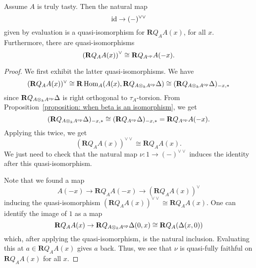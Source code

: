 \documentclass[dissertation.tex]{subfiles}
\begin{document}
\begin{lemma} \label{lemma: duality really is a duality}
  Assume \(A\) is truly tasty. Then the natural map 
  \begin{displaymath}
    \operatorname{id} \to (-)^{\vee \vee}
  \end{displaymath}
  given by evaluation is a quasi-isomorphism for \(\mathbf{R}Q_A A(x)\), for all \(x\). Furthermore, there are quasi-isomorphisms
  \begin{displaymath}
    \left( \mathbf{R}Q_A A(x) \right)^\vee \cong \mathbf{R}Q_{A^{\operatorname{op}}} A(-x).
  \end{displaymath}
\end{lemma}

\begin{proof}
  We first exhibit the latter quasi-isomorphisms. We have 
  \begin{displaymath}
    (\mathbf{R}Q_A A(x))^\vee \cong \mathbf{R}\operatorname{Hom}_A (A(x), \mathbf{R}Q_{A \otimes_k A^{\operatorname{op}}} \Delta) \cong (\mathbf{R}Q_{A \otimes_k A^{\operatorname{op}}} \Delta)_{-x,\ast}
  \end{displaymath}
  since \(\mathbf{R}Q_{A \otimes_k A^{\operatorname{op}}} \Delta\) is right orthogonal to \(\tau_A\)-torsion. From Proposition~\ref{proposition: when beta is an isomorphism}, we get 
  \begin{displaymath}
    (\mathbf{R}Q_{A \otimes_k A^{\operatorname{op}}} \Delta)_{-x,\ast} \cong (\mathbf{R}Q_{A^{\operatorname{op}}} \Delta)_{-x,\ast} = \mathbf{R}Q_{A^{\operatorname{op}}} A(-x).
  \end{displaymath}
  Applying this twice, we get 
  \begin{displaymath}
    (\mathbf{R}Q_A A(x))^{\vee \vee} \cong \mathbf{R}Q_A A(x).
  \end{displaymath}
  We just need to check that the natural map \(\nu : 1 \to (-)^{\vee \vee}\) induces the identity after this quasi-isomorphism.

  Note that we found a map
  \begin{displaymath}
    A(-x) \to \mathbf{R}Q_A A(-x) \to ( \mathbf{R}Q_A A(x) )^\vee 
  \end{displaymath}
  inducing the quasi-isomorphism \((\mathbf{R}Q_A A(x))^{\vee \vee} \cong \mathbf{R}Q_A A(x)\). One can identify the image of \(1\) as a map 
  \begin{displaymath}
    \mathbf{R}Q_A A(x) \to \mathbf{R}Q_{A \otimes_k A^{\operatorname{op}}} \Delta (0,x) \cong \mathbf{R}Q_A ( \Delta (x,0) )
  \end{displaymath}
  which, after applying the quasi-isomorphism, is the natural inclusion. Evaluating this at \(a \in \mathbf{R}Q_A A(x)\) gives \(a\) back. Thus, we see that \(\nu\) is quasi-fully faithful on \(\mathbf{R}Q_A A(x)\) for all \(x\). 
\end{proof}
\end{document}
